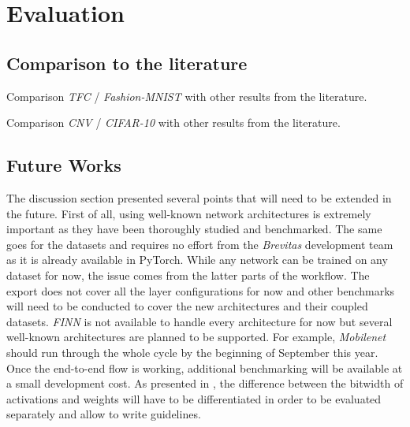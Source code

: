 
\section{Evaluation}


\subsection{Comparison to the literature}


Comparison \emph{TFC} / \emph{Fashion-MNIST} with other results from the literature.

Comparison \emph{CNV} / \emph{CIFAR-10} with other results from the literature.

\subsection{Future Works}

The discussion section presented several points that will need to be extended in the future. First of all, using well-known network architectures is extremely important as they have been thoroughly studied and benchmarked. The same goes for the datasets and requires no effort from the \emph{Brevitas} development team as it is already available in PyTorch. While any network can be trained on any dataset for now, the issue comes from the latter parts of the workflow. The export does not cover all the layer configurations for now and other benchmarks will need to be conducted to cover the new architectures and their coupled datasets. \emph{FINN} is not available to handle every architecture for now but several well-known architectures are planned to be supported. For example, \emph{Mobilenet} should run through the whole cycle by the beginning of September this year. Once the end-to-end flow is working, additional benchmarking will be available at a small development cost. As presented in \cite{Bacchus2020}, the difference between the bitwidth of activations and weights will have to be differentiated in order to be evaluated separately and allow to write guidelines.

